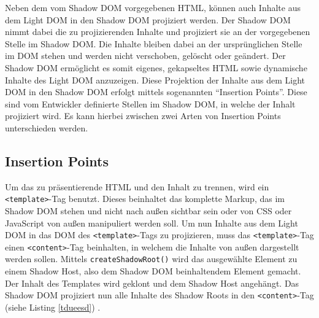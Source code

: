 Neben dem vom Shadow \ac{DOM} vorgegebenen \ac{HTML}, können auch Inhalte aus dem Light \ac{DOM} in den Shadow \ac{DOM} projiziert werden. Der Shadow \ac{DOM} nimmt dabei die zu projizierenden Inhalte und projiziert sie an der vorgegebenen Stelle im Shadow \ac{DOM}. Die Inhalte bleiben dabei an der ursprünglichen Stelle im \ac{DOM} stehen und werden nicht verschoben, gelöscht oder geändert. Der Shadow \ac{DOM} ermöglicht es somit eigenes, gekapseltes \ac{HTML} sowie dynamische Inhalte des Light \ac{DOM} anzuzeigen. Diese Projektion der Inhalte aus dem Light \ac{DOM} in den Shadow \ac{DOM} erfolgt mittels sogenannten ``Insertion Points''. Diese sind vom Entwickler definierte Stellen im Shadow \ac{DOM}, in welche der Inhalt projiziert wird. Es kann hierbei zwischen zwei Arten von Insertion Points unterschieden werden.

\subsection{Insertion Points}\label{insertion-points}

Um das zu präsentierende \ac{HTML} und den Inhalt zu trennen, wird ein \texttt{\textless{}template\textgreater{}}-Tag benutzt. Dieses beinhaltet das komplette Markup, das im Shadow \ac{DOM} stehen und nicht nach außen sichtbar sein oder von \ac{CSS} oder JavaScript von außen manipuliert werden soll. Um nun Inhalte aus dem Light \ac{DOM} in das \ac{DOM} des \texttt{\textless{}template\textgreater{}}-Tags zu projizieren, muss das \texttt{\textless{}template\textgreater{}}-Tag einen \texttt{\textless{}content\textgreater{}}-Tag beinhalten, in welchem die Inhalte von außen dargestellt werden sollen. Mittels \texttt{createShadowRoot()} wird das ausgewählte Element zu einem Shadow Host, also dem Shadow \ac{DOM} beinhaltendem Element gemacht. Der Inhalt des Templates wird geklont und dem Shadow Host angehängt. Das Shadow \ac{DOM} projiziert nun alle Inhalte des Shadow Roots in den \texttt{\textless{}content\textgreater{}}-Tag (siehe Listing \ref{tdueesd}) \cite{citeulike:13851404}.



